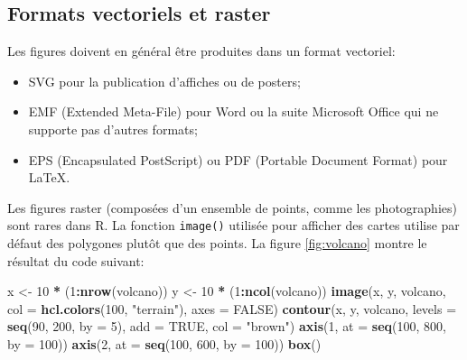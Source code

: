 \documentclass[
  12pt,
  french,
  a4paper,
  extrafontsizes,onecolumn,openright
  ]{memoir}
\newenvironment{Shaded}{\begin{snugshade}}{\end{snugshade}}
\newcommand{\DataTypeTok}[1]{\textcolor[rgb]{0.13,0.29,0.53}{#1}}
\newcommand{\DecValTok}[1]{\textcolor[rgb]{0.00,0.00,0.81}{#1}}
\newcommand{\KeywordTok}[1]{\textcolor[rgb]{0.13,0.29,0.53}{\textbf{#1}}}
\newcommand{\NormalTok}[1]{#1}
\newcommand{\OperatorTok}[1]{\textcolor[rgb]{0.81,0.36,0.00}{\textbf{#1}}}
\newcommand{\OtherTok}[1]{\textcolor[rgb]{0.56,0.35,0.01}{#1}}
\newcommand{\StringTok}[1]{\textcolor[rgb]{0.31,0.60,0.02}{#1}}
\providecommand{\tightlist}{%
  \setlength{\itemsep}{0pt}\setlength{\parskip}{0pt}}
\begin{document}
\hypertarget{formats-vectoriels-et-raster}{%
\subsection{Formats vectoriels et raster}\label{formats-vectoriels-et-raster}}

Les figures doivent en général être produites dans un format vectoriel:

\begin{itemize}
\tightlist
\item
  SVG pour la publication d'affiches ou de posters;
\item
  EMF (Extended Meta-File) pour Word ou la suite Microsoft Office qui ne supporte pas d'autres formats;
\item
  EPS (Encapsulated PostScript) ou PDF (Portable Document Format) pour LaTeX.
\end{itemize}

Les figures raster (composées d'un ensemble de points, comme les photographies) sont rares dans R.
La fonction \texttt{image()} utilisée pour afficher des cartes utilise par défaut des polygones plutôt que des points.
La figure \ref{fig:volcano} montre le résultat du code suivant:



\scriptsize

\begin{Shaded}
\begin{Highlighting}[]
\NormalTok{x <-}\StringTok{ }\DecValTok{10} \OperatorTok{*}\StringTok{ }\NormalTok{(}\DecValTok{1}\OperatorTok{:}\KeywordTok{nrow}\NormalTok{(volcano))}
\NormalTok{y <-}\StringTok{ }\DecValTok{10} \OperatorTok{*}\StringTok{ }\NormalTok{(}\DecValTok{1}\OperatorTok{:}\KeywordTok{ncol}\NormalTok{(volcano))}
\KeywordTok{image}\NormalTok{(x, y, volcano, }\DataTypeTok{col =} \KeywordTok{hcl.colors}\NormalTok{(}\DecValTok{100}\NormalTok{, }\StringTok{"terrain"}\NormalTok{), }\DataTypeTok{axes =} \OtherTok{FALSE}\NormalTok{)}
\KeywordTok{contour}\NormalTok{(x, y, volcano, }\DataTypeTok{levels =} \KeywordTok{seq}\NormalTok{(}\DecValTok{90}\NormalTok{, }\DecValTok{200}\NormalTok{, }\DataTypeTok{by =} \DecValTok{5}\NormalTok{), }\DataTypeTok{add =} \OtherTok{TRUE}\NormalTok{,}
    \DataTypeTok{col =} \StringTok{"brown"}\NormalTok{)}
\KeywordTok{axis}\NormalTok{(}\DecValTok{1}\NormalTok{, }\DataTypeTok{at =} \KeywordTok{seq}\NormalTok{(}\DecValTok{100}\NormalTok{, }\DecValTok{800}\NormalTok{, }\DataTypeTok{by =} \DecValTok{100}\NormalTok{))}
\KeywordTok{axis}\NormalTok{(}\DecValTok{2}\NormalTok{, }\DataTypeTok{at =} \KeywordTok{seq}\NormalTok{(}\DecValTok{100}\NormalTok{, }\DecValTok{600}\NormalTok{, }\DataTypeTok{by =} \DecValTok{100}\NormalTok{))}
\KeywordTok{box}\NormalTok{()}
\end{Highlighting}
\end{Shaded}
\end{document}
